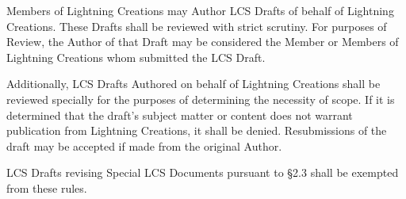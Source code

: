 Members of Lightning Creations may Author LCS Drafts of behalf of
Lightning Creations. These Drafts shall be reviewed with strict
scrutiny. For purposes of Review, the Author of that Draft may be
considered the Member or Members of Lightning Creations whom submitted
the LCS Draft.

Additionally, LCS Drafts Authored on behalf of Lightning Creations shall
be reviewed specially for the purposes of determining the necessity of
scope. If it is determined that the draft's subject matter or content
does not warrant publication from Lightning Creations, it shall be
denied. Resubmissions of the draft may be accepted if made from the
original Author.

LCS Drafts revising Special LCS Documents pursuant to §2.3 shall be
exempted from these rules.
